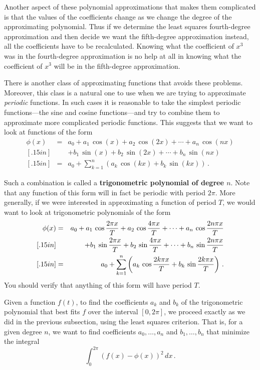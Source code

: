 {{{{Another aspect of these polynomial approximations that makes them complicated is that the values of the coefficients change as we change the degree of the approximating polynomial.  Thus if we determine the least squares fourth-degree approximation and then decide we want the fifth-degree approximation instead, all the coefficients have to be recalculated.  Knowing what the coefficient of $x^3$ was in the fourth-degree approximation is no help at all in knowing what the coefficient of $x^3$ will be in the fifth-degree approximation.

There is another class of approximating functions that avoids these problems.  Moreover, this class is a natural one to use 
when we are trying to approximate {\em periodic} functions. In such cases it is reasonable to take the simplest periodic functions---the sine and cosine functions---and try to combine them to approximate more complicated periodic functions.  This suggests that we want to look at functions of the form
\begin{eqnarray*}
\phi(x) &= &a_0 +a_1\,\cos(x)+ a_2\,\cos(2x) + \cdots+ a_n\,\cos(nx) \\ [.15in]
	& & +b_1\,\sin(x) + b_2\,\sin(2x) + \cdots + b_n\,\sin(nx) \\ [.15in]
	&=&a_0+\sum_{k=1}^n \left(a_k\,\cos(kx)+b_k\,\sin(kx)\right) \,.
\end{eqnarray*}

Such a combination is called a {\bf trigonometric polynomial of degree $n$}.  Note that any function of this form will in fact be periodic with period $2\pi$.  More generally, if we were interested in approximating a function of period $T$, we would want to look at trigonometric polynomials of the form
\begin{eqnarray*}
\phi(x) &= &a_0 +a_1\,\cos{2\pi x \over T}+ a_2\,\cos{4\pi x \over T} + \cdots+ a_n\,\cos{2n\pi x \over T} \\ [.15in]
	& & +b_1\,\sin{2\pi x \over T}+ b_2\,\sin{4\pi x \over T} + \cdots+ b_n\,\sin{2n\pi x \over T} \\ [.15in]
	&=&a_0+\sum_{k=1}^n \left(a_k\,\cos{2k\pi x\over T}+b_k\,\sin{2k\pi x\over T}\right) \,.
\end{eqnarray*}
You should verify that anything of this form will have period $T$.

Given a function $f(t)$, to find the coefficients $a_k$ and $b_k$ of the trigonometric polynomial that best fits $f$ over the interval $[0, 2\pi ]$, we proceed exactly as we did in the previous subsection, using the least squares criterion.  That is, for a given degree $n$, we want to find coefficients
$a_0, \ldots , a_n$ and $b_1, \ldots , b_n$ that minimize the integral
\[
\int_0^{2\pi} \left( f(x) -\phi (x)\right)^2\, dx \, .
\] 

}}}}
